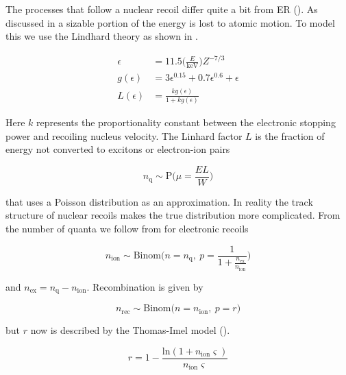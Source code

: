 The processes that follow a nuclear recoil differ quite a bit from ER ().  As
discussed in  a sizable portion of the energy is lost to atomic motion.  To model this we use the Lindhard theory
as shown in .

\begin{equation}
\begin{aligned}
\epsilon &= 11.5 \Big( \frac{E}{\mathrm{keV}} \Big) Z^{-7/3} \\
g( \epsilon ) &= 3 \epsilon ^{0.15} + 0.7 \epsilon ^{0.6} + \epsilon \\
L( \epsilon ) &= \frac{k g( \epsilon ) }{1 + k g( \epsilon )}
\label{eq:er_nr_calibrations_parameter_determ_nr_lindhard}
\end{aligned}
\end{equation}

Here $k$ represents the proportionality constant between the electronic stopping power and recoiling nucleus velocity.  The Linhard factor
$L$ is the fraction of energy not converted to excitons or electron-ion pairs

\begin{equation}
n_{\mathrm{q}} \sim \mathrm{P} \Big( \mu = \frac{E L}{W} \Big)
\end{equation}

\noindent that uses a Poisson distribution as an approximation.  In reality the track structure of nuclear recoils makes the true
distribution more complicated.  From the number of quanta we follow from  for
electronic recoils

\begin{equation}
n_{\mathrm{ion}} \sim \mathrm{Binom} \Bigg(n = n_{\mathrm{q}},\ p = \frac{1}{1 + \frac{n_{\mathrm{ex}}}{n_{\mathrm{ion}}}} \Bigg)
\end{equation}

\noindent and $n_{\mathrm{ex}} = n_{\mathrm{q}} - n_{\mathrm{ion}}$.  Recombination is given by

\begin{equation}
n_{\mathrm{rec}} \sim \mathrm{Binom} \Big(n = n_{\mathrm{ion}},\ p = r \Big)
\end{equation}

\noindent but $r$ now is described by the Thomas-Imel model ().

\begin{equation}
r = 1 - \frac{\mathrm{ln} (1 + n_{\mathrm{ion}} \varsigma)}{n_{\mathrm{ion}} \varsigma}
\end{equation}

